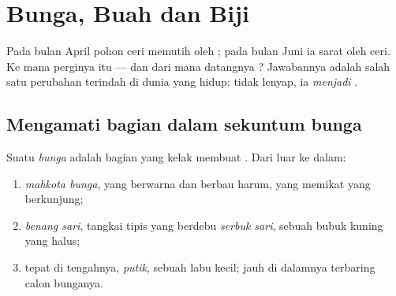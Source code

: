 \chapter{Bunga, Buah dan Biji}\label{ch:g3:flowers-fruits-seeds}

Pada bulan April pohon ceri memutih oleh ; pada bulan Juni ia
sarat oleh  ceri. Ke mana perginya  itu --- dan dari
mana datangnya ? Jawabannya adalah salah satu perubahan
terindah di dunia yang hidup:  tidak lenyap, ia \emph{menjadi}
.

\section{Mengamati bagian dalam sekuntum bunga}

\begin{definition}\label{def:g3:flowers-fruits-seeds:parts}
Suatu \emph{bunga} adalah bagian  yang kelak
membuat . Dari luar ke dalam:
\begin{enumerate}
  \item \emph{mahkota bunga}, yang berwarna dan
        berbau harum, yang memikat  yang berkunjung;
  \item \emph{benang sari}, tangkai tipis yang
        berdebu \emph{serbuk sari}, sebuah bubuk
        kuning yang halus;
  \item tepat di tengahnya, \emph{putik}, sebuah labu
        kecil; jauh di dalamnya terbaring calon  bunganya.
\end{enumerate}
\end{definition}

